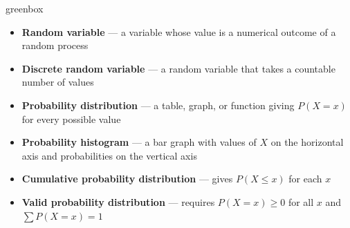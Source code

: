 \documentclass[10pt]{article}
\begin{document}
\begin{skillbox}{greenbox}
\begin{minipage}[t]{0.48\linewidth}
    \begin{itemize}
        \item \textbf{Random variable} --- a variable whose value is a numerical outcome of a
              random process
        \item \textbf{Discrete random variable} --- a random variable that takes a countable
              number of values
        \item \textbf{Probability distribution} --- a table, graph, or function giving $P(X=x)$
              for every possible value
    \end{itemize}
\end{minipage}
\hfill
\begin{minipage}[t]{0.48\linewidth}
    \begin{itemize}
        \item \textbf{Probability histogram} --- a bar graph with values of $X$ on the
              horizontal axis and probabilities on the vertical axis
        \item \textbf{Cumulative probability distribution} --- gives $P(X \le x)$ for each $x$
        \item \textbf{Valid probability distribution} --- requires $P(X=x) \ge 0$ for all $x$
              and $\sum P(X=x) = 1$
    \end{itemize}
\end{minipage}
\end{skillbox}
\end{document}

